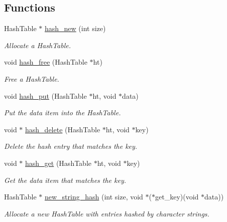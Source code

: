 \subsection*{Functions}
\begin{DoxyCompactItemize}
\item 
Hash\+Table $\ast$ \hyperlink{group__hash_ga5c5c7364cbafc96b9cb5e16db229494e}{hash\+\_\+new} (int size)
\begin{DoxyCompactList}\small\item\em Allocate a Hash\+Table. \end{DoxyCompactList}\item 
void \hyperlink{group__hash_ga30d10595d9b6fd1f5078dc3d280f4d0f}{hash\+\_\+free} (Hash\+Table $\ast$ht)
\begin{DoxyCompactList}\small\item\em Free a Hash\+Table. \end{DoxyCompactList}\item 
void \hyperlink{group__hash_gabb3e92803e5e58da89747b7f60cd685a}{hash\+\_\+put} (Hash\+Table $\ast$ht, void $\ast$data)
\begin{DoxyCompactList}\small\item\em Put the data item into the Hash\+Table. \end{DoxyCompactList}\item 
void $\ast$ \hyperlink{group__hash_ga4bbe51c4d1aac0038cc86f9f12f877d0}{hash\+\_\+delete} (Hash\+Table $\ast$ht, void $\ast$key)
\begin{DoxyCompactList}\small\item\em Delete the hash entry that matches the key. \end{DoxyCompactList}\item 
void $\ast$ \hyperlink{group__hash_ga92a539c92a9ff17735271e171b70adab}{hash\+\_\+get} (Hash\+Table $\ast$ht, void $\ast$key)
\begin{DoxyCompactList}\small\item\em Get the data item that matches the key. \end{DoxyCompactList}\item 
Hash\+Table $\ast$ \hyperlink{group__hash_ga3ba3e849838d8f449a3f995423db5de1}{new\+\_\+string\+\_\+hash} (int size, void $\ast$($\ast$get\+\_\+key)(void $\ast$data))
\begin{DoxyCompactList}\small\item\em Allocate a new Hash\+Table with entries hashed by character strings. \end{DoxyCompactList}\item 

\end{DoxyCompactItemize}
